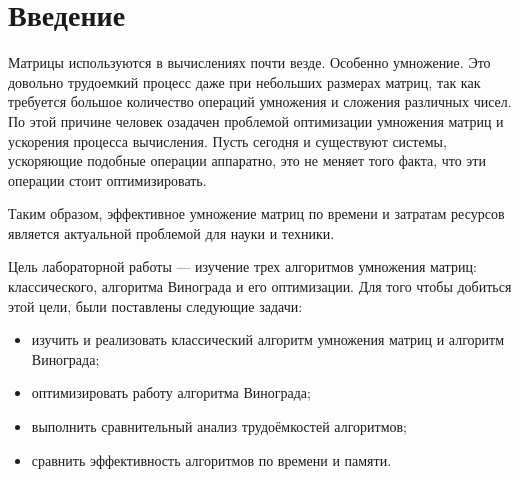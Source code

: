 \chapter*{Введение}

Матрицы используются в вычислениях почти везде. Особенно умножение. Это довольно трудоемкий процесс даже при небольших размерах матриц, так как требуется большое количество операций умножения и сложения различных чисел. По этой причине человек озадачен проблемой оптимизации умножения матриц и ускорения процесса вычисления. Пусть сегодня и существуют системы, ускоряющие подобные операции аппаратно, это не меняет того факта, что эти операции стоит оптимизировать.

Таким образом, эффективное умножение матриц по времени и затратам ресурсов является актуальной проблемой для науки и техники.

Цель лабораторной работы --- изучение трех алгоритмов умножения матриц: классического, алгоритма Винограда и его оптимизации. Для того чтобы добиться этой цели, были поставлены следующие задачи:
\begin{itemize}
	\item изучить и реализовать классический алгоритм умножения матриц и алгоритм Винограда;
	\item оптимизировать работу алгоритма Винограда;
	\item выполнить сравнительный анализ трудоёмкостей алгоритмов;
	\item сравнить эффективность алгоритмов по времени и памяти.
\end{itemize}
